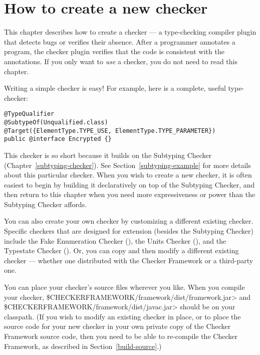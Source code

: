 \htmlhr
\chapter{How to create a new checker\label{writing-a-checker}}

\newcommand{\TreeAPIBase}{https://docs.oracle.com/javase/8/docs/jdk/api/javac/tree/com/sun/source/}
\newcommand{\refTreeclass}[2]{\href{\TreeAPIBase{}/#1/#2.html?is-external=true}{\<#2>}}
\newcommand{\ModelAPIBase}{http://docs.oracle.com/javase/8/docs/api/javax/lang/model/}
\newcommand{\refModelclass}[2]{\href{\ModelAPIBase{}/#1/#2.html?is-external=true}{\<#2>}}

This chapter describes how to create a checker
--- a type-checking compiler plugin that detects bugs or verifies their
absence.  After a programmer annotates a program,
the checker plugin verifies that the code is consistent
with the annotations.
If you only want to \emph{use} a checker, you do not need to read this
chapter.

Writing a simple checker is easy!  For example, here is a complete, useful
type-checker:

\begin{Verbatim}
@TypeQualifier
@SubtypeOf(Unqualified.class)
@Target({ElementType.TYPE_USE, ElementType.TYPE_PARAMETER})
public @interface Encrypted {}
\end{Verbatim}

This checker is so short because it builds on the Subtyping Checker
(Chapter~\ref{subtyping-checker}).
See Section~\ref{subtyping-example} for more details about this particular checker.
When you wish to create a new checker, it is often easiest to begin by
building it declaratively on top of the Subtyping Checker, and then return to
this chapter when you need more expressiveness or power than the Subtyping
Checker affords.

You can also create your own checker by customizing a different existing
checker.  Specific checkers that are designed for extension (besides the Subtyping
Checker) include the Fake Enumeration Checker
(), the Units Checker
(), and the Typestate Checker
().
Or, you can copy and then modify a different existing checker --- whether
one distributed with the Checker Framework or a third-party one.

\begin{sloppypar}
You can place your checker's source files wherever you like.  When you
compile your checker, \<\$CHECKERFRAMEWORK/framework/dist/framework.jar> and \<\$CHECKERFRAMEWORK/framework/dist/javac.jar>
should be on your classpath.  (If you wish to modify an existing checker in place,
or to place the source code for your new checker in your own private copy of the
Checker Framework source code, then you need to be able to re-compile the
Checker Framework, as described in Section~\ref{build-source}.)
\end{sloppypar}

